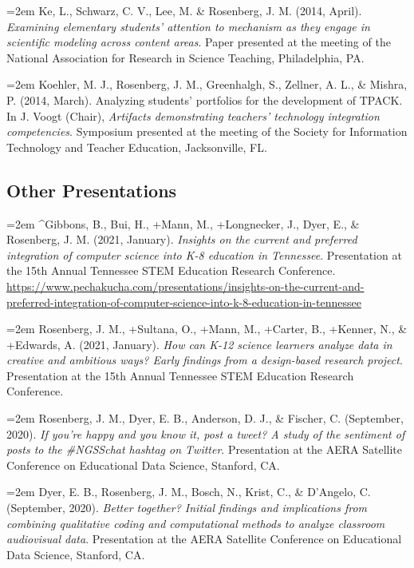 \documentclass[
  14,
]{article}
\begin{document}
\hangindent=2em Ke, L., Schwarz, C. V., Lee, M. \& Rosenberg, J. M.
(2014, April). \emph{Examining elementary students' attention to
mechanism as they engage in scientific modeling across content areas}.
Paper presented at the meeting of the National Association for Research
in Science Teaching, Philadelphia, PA.

\hangindent=2em Koehler, M. J., Rosenberg, J. M., Greenhalgh, S.,
Zellner, A. L., \& Mishra, P. (2014, March). Analyzing students'
portfolios for the development of TPACK. In J. Voogt (Chair),
\emph{Artifacts demonstrating teachers' technology integration
competencies}. Symposium presented at the meeting of the Society for
Information Technology and Teacher Education, Jacksonville, FL.

\hypertarget{other-presentations}{%
\subsection{Other Presentations}\label{other-presentations}}

\hangindent=2em \^{}Gibbons, B., Bui, H., +Mann, M., +Longnecker, J.,
Dyer, E., \& Rosenberg, J. M. (2021, January). \emph{Insights on the
current and preferred integration of computer science into K-8 education
in Tennessee}. Presentation at the 15th Annual Tennessee STEM Education
Research Conference.
\url{https://www.pechakucha.com/presentations/insights-on-the-current-and-preferred-integration-of-computer-science-into-k-8-education-in-tennessee}

\hangindent=2em Rosenberg, J. M., +Sultana, O., +Mann, M., +Carter, B.,
+Kenner, N., \& +Edwards, A. (2021, January). \emph{How can K-12 science
learners analyze data in creative and ambitious ways? Early findings
from a design-based research project}. Presentation at the 15th Annual
Tennessee STEM Education Research Conference.

\hangindent=2em Rosenberg, J. M., Dyer, E. B., Anderson, D. J., \&
Fischer, C. (September, 2020). \emph{If you're happy and you know it,
post a tweet? A study of the sentiment of posts to the \#NGSSchat
hashtag on Twitter}. Presentation at the AERA Satellite Conference on
Educational Data Science, Stanford, CA.

\hangindent=2em Dyer, E. B., Rosenberg, J. M., Bosch, N., Krist, C., \&
D'Angelo, C. (September, 2020). \emph{Better together? Initial findings
and implications from combining qualitative coding and computational
methods to analyze classroom audiovisual data}. Presentation at the AERA
Satellite Conference on Educational Data Science, Stanford, CA.
\end{document}
